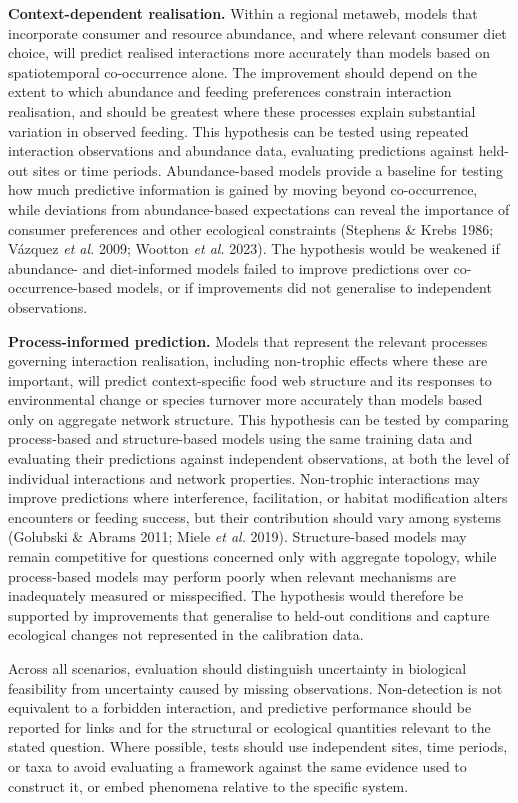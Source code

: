 \documentclass[
]{article}
\begin{document}
\begin{tcolorbox}
\textbf{Context-dependent realisation.} Within a regional metaweb,
models that incorporate consumer and resource abundance, and where
relevant consumer diet choice, will predict realised interactions more
accurately than models based on spatiotemporal co-occurrence alone. The
improvement should depend on the extent to which abundance and feeding
preferences constrain interaction realisation, and should be greatest
where these processes explain substantial variation in observed feeding.
This hypothesis can be tested using repeated interaction observations
and abundance data, evaluating predictions against held-out sites or
time periods. Abundance-based models provide a baseline for testing how
much predictive information is gained by moving beyond co-occurrence,
while deviations from abundance-based expectations can reveal the
importance of consumer preferences and other ecological constraints
(Stephens \& Krebs 1986; Vázquez \emph{et al.} 2009; Wootton \emph{et
al.} 2023). The hypothesis would be weakened if abundance- and
diet-informed models failed to improve predictions over
co-occurrence-based models, or if improvements did not generalise to
independent observations.

\textbf{Process-informed prediction.} Models that represent the relevant
processes governing interaction realisation, including non-trophic
effects where these are important, will predict context-specific food
web structure and its responses to environmental change or species
turnover more accurately than models based only on aggregate network
structure. This hypothesis can be tested by comparing process-based and
structure-based models using the same training data and evaluating their
predictions against independent observations, at both the level of
individual interactions and network properties. Non-trophic interactions
may improve predictions where interference, facilitation, or habitat
modification alters encounters or feeding success, but their
contribution should vary among systems (Golubski \& Abrams 2011; Miele
\emph{et al.} 2019). Structure-based models may remain competitive for
questions concerned only with aggregate topology, while process-based
models may perform poorly when relevant mechanisms are inadequately
measured or misspecified. The hypothesis would therefore be supported by
improvements that generalise to held-out conditions and capture
ecological changes not represented in the calibration data.

Across all scenarios, evaluation should distinguish uncertainty in
biological feasibility from uncertainty caused by missing observations.
Non-detection is not equivalent to a forbidden interaction, and
predictive performance should be reported for links and for the
structural or ecological quantities relevant to the stated question.
Where possible, tests should use independent sites, time periods, or
taxa to avoid evaluating a framework against the same evidence used to
construct it, or embed phenomena relative to the specific system.

\end{tcolorbox}
\end{document}
